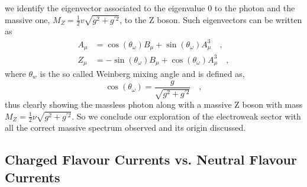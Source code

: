 %
we identify the eigenvector associated to the eigenvalue 0 to the photon and the massive one, $ M_Z =  \frac{1}{2} v \sqrt{g^2 + g^{\prime 2}} $, to the Z boson. Such eigenvectors can be written as
%
\begin{align}
A_\mu &=\cos(\theta_\omega) B_\mu + \sin(\theta_\omega) A_\mu^3 \quad ,  \\  
Z_\mu & =- \sin(\theta_\omega) B_\mu + \cos(\theta_\omega) A_\mu^3 \quad , 
\end{align}
%
where $\theta_w$ is the so called Weinberg mixing angle and is defined as, 
%
\begin{equation}
\cos(\theta_\omega)=\frac{g}{ \sqrt{g^2 + g^{\prime 2}}} \quad ,  
\end{equation}
%
thus clearly showing the massless photon along with a massive Z boson with mass $M_Z= \frac{1}{2} \nu \sqrt{g^2 + g^{\prime 2}} $. 
%
So we conclude our exploration of the electroweak sector with all the correct massive spectrum observed and its origin discussed.

 

\subsection{Charged Flavour Currents vs. Neutral Flavour Currents}

